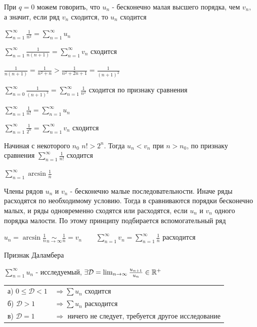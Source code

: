 \documentclass[12pt]{article}
\begin{document}
    \Nota При $q = 0$ можем говорить, что $u_n$ - бесконечно малая высшего порядка, чем $v_n$, а значит, если ряд $v_n$
    сходится, то $u_n$ сходится

     $\sum_{n = 1}^\infty \frac{1}{n^2} = \sum_{n = 1}^\infty u_n$

    $\sum_{n = 1}^\infty \frac{1}{n(n + 1)} = \sum_{n = 1}^\infty v_n$ сходится

    $\frac{1}{n(n + 1)} = \frac{1}{n^2 + n} > \frac{1}{n^2 + 2n + 1} = \frac{1}{(n + 1)^2}$

    $\sum_{n = 0}^\infty \frac{1}{(n + 1)^2} = \sum_{n = 1}^\infty \frac{1}{n^2}$ сходится по признаку сравнения

     $\sum_{n = 1}^\infty \frac{1}{n!} = \sum_{n = 1}^\infty u_n$

    $\sum_{n = 1}^\infty \frac{1}{2^n} = \sum_{n = 1}^\infty v_n$ сходится

    Начиная с некоторого $n_0$ $n! > 2^n$. Тогда $u_n < v_n$ при $n > n_0$, по признаку сравнения $\sum_{n = 1}^\infty \frac{1}{n!}$ сходится


     $\sum_{n = 1}^\infty \arcsin \frac{1}{n}$

    \Nota Члены рядов $u_n$ и $v_n$ - бесконечно малые последовательности. Иначе ряды расходятся по необходимому условию.
    Тогда в  сравниваются порядки бесконечно малых, и ряды одновременно сходятся или расходятся, если $u_n$ и $v_n$ одного
    порядка малости. По этому принципу подбирается вспомогательный ряд

    $u_n = \arcsin \frac{1}{n} \underset{n \to \infty}{\sim} \frac{1}{n} = v_n \quad\quad \sum_{n = 1}^\infty v_n = \sum_{n = 1}^\infty \frac{1}{n}$ расходится

    \hypertarget{dalambersign}{}

    \begin{MyTheorem}
         Признак Даламбера

        $\sum_{n = 1}^\infty u_n$ - исследуемый, $\exists \mathcal{D} = \lim_{n \to \infty} \frac{u_{n + 1}}{u_n} \in \mathbb{R}^+$

        \begin{tabular}{ll}
            а) $0 \leq \mathcal{D} < 1$ & $\Longrightarrow \sum u_n$ сходится                                \\

            б) $\mathcal{D} > 1$        & $\Longrightarrow \sum u_n$ расходится                              \\

            в) $\mathcal{D} = 1$        & $\Longrightarrow$ ничего не следует, требуется другое исследование \\
        \end{tabular}
    \end{MyTheorem}
\end{document}
